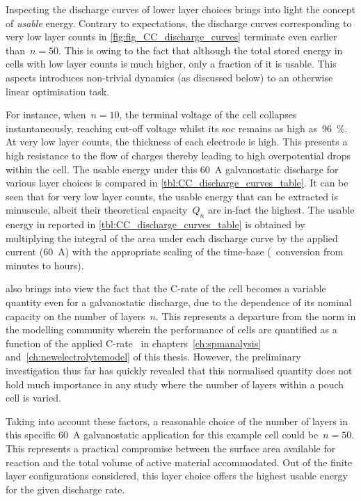 Inspecting the  discharge curves of  lower layer  choices brings into  light the
concept of \emph{usable} energy. Contrary  to expectations, the discharge curves
corresponding  to very  low layer  counts in  \cref{fig:fig_CC_discharge_curves}
terminate even earlier than~${n=50}$. This is  owing to the fact that although the
total  stored energy  in cells  with low  layer counts  is much  higher, only  a
fraction  of it  is usable.  This  aspects introduces  non-trivial dynamics  (as
discussed below) to an otherwise linear optimisation task.

For  instance,  when~${n  =  10}$,  the terminal  voltage  of  the cell  collapses
instantaneously, reaching cut-off  voltage whilst its \gls{soc}  remains as high
as~\SI{96}{\percent}. At very low layer  counts, the thickness of each electrode
is high. This presents a high resistance  to the flow of charges thereby leading
to  high overpotential  drops  within the  cell. The  usable  energy under  this
\SI{60}{\ampere} galvanostatic  discharge for various layer  choices is compared
in \cref{tbl:CC_discharge_curves_table}. It can be  seen that for very low layer
counts,  the usable  energy that  can be  extracted is  minuscule, albeit  their
theoretical  capacity~$Q_n$  are  in-fact  the highest.  The  usable  energy  in
\SI{}{\watthour} reported in \cref{tbl:CC_discharge_curves_table} is obtained by
multiplying the integral  of the area under each discharge  curve by the applied
current  (\SI{60}{\ampere})  with  the  appropriate  scaling  of  the  time-base
(\ie~conversion from minutes to hours).



  also brings  into view  the fact  that the
\mbox{C-rate} of the  cell becomes a variable quantity even  for a galvanostatic
discharge,  due to  the dependence  of  its nominal  capacity on  the number  of
layers~$n$. This represents a departure from the norm in the modelling community
wherein the  performance of cells  are quantified as  a function of  the applied
C-rate  \eg~in  chapters~\ref{ch:spmanalysis} and~\ref{ch:newelectrolytemodel}
of  this thesis.  However, the  preliminary investigation  thus far  has quickly
revealed that  this normalised  quantity does  not hold  much importance  in any
study where the number of layers within a pouch cell is varied.

Taking into account  these factors, a reasonable choice of  the number of layers
in  this specific  \SI{60}{\ampere} galvanostatic  application for  this example
cell  could  be~${n=50}$.  This  represents  a  practical compromise  between  the
surface area  available for  reaction and  the total  volume of  active material
accommodated.  Out of  the finite  layer configurations  considered, this  layer
choice offers the highest usable energy for the given discharge rate.

